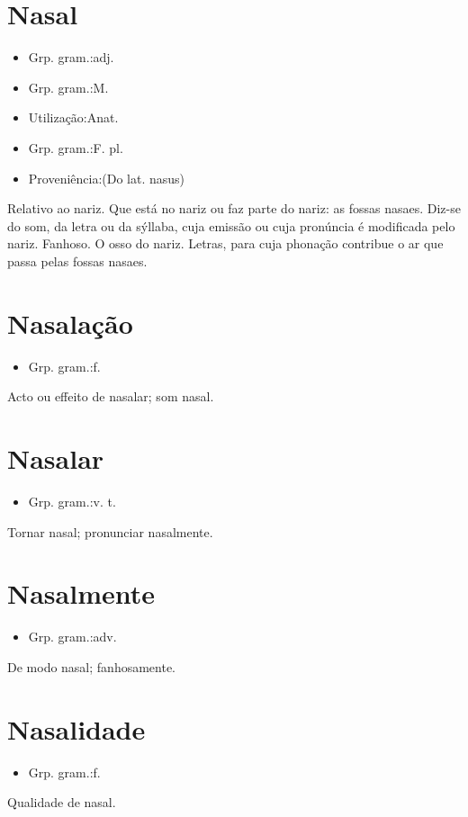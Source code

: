 \section{Nasal}
\begin{itemize}
\item {Grp. gram.:adj.}
\end{itemize}
\begin{itemize}
\item {Grp. gram.:M.}
\end{itemize}
\begin{itemize}
\item {Utilização:Anat.}
\end{itemize}
\begin{itemize}
\item {Grp. gram.:F. pl.}
\end{itemize}
\begin{itemize}
\item {Proveniência:(Do lat. \textunderscore nasus\textunderscore )}
\end{itemize}
Relativo ao nariz.
Que está no nariz ou faz parte do nariz: \textunderscore as fossas nasaes\textunderscore .
Diz-se do som, da letra ou da sýllaba, cuja emissão ou cuja pronúncia é modificada pelo nariz.
Fanhoso.
O osso do nariz.
Letras, para cuja phonação contribue o ar que passa pelas fossas nasaes.
\section{Nasalação}
\begin{itemize}
\item {Grp. gram.:f.}
\end{itemize}
Acto ou effeito de nasalar; som nasal.
\section{Nasalar}
\begin{itemize}
\item {Grp. gram.:v. t.}
\end{itemize}
Tornar nasal; pronunciar nasalmente.
\section{Nasalmente}
\begin{itemize}
\item {Grp. gram.:adv.}
\end{itemize}
De modo nasal; fanhosamente.
\section{Nasalidade}
\begin{itemize}
\item {Grp. gram.:f.}
\end{itemize}
Qualidade de nasal.
